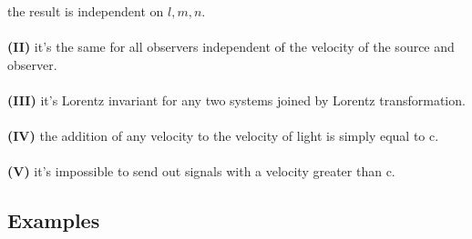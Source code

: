 \documentclass{article}
\begin{document}
the result is independent on $l,m,n$.
\\\\\textbf{(II)} it's the same for all observers independent of the velocity of the source and observer.
\\\\\textbf{(III)} it's Lorentz invariant for any two systems joined by Lorentz transformation.
\\\\\textbf{(IV)} the addition of any velocity to the velocity of light is simply equal to c.
\\\\\textbf{(V)} it's impossible to send out signals with a velocity greater than c.

\newpage

\subsection{Examples}
\end{document}
